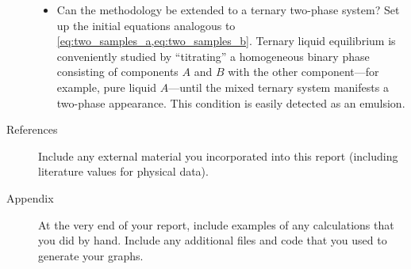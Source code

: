 \begin{description}
\begin{itemize}
		\item Can the methodology be extended to a ternary two-phase system?
		Set up the initial equations analogous to \cref{eq:two_samples_a,eq:two_samples_b}. 
		Ternary liquid equilibrium is conveniently studied by ``titrating'' a homogeneous binary phase consisting of components \(A\) and \(B\) with the other component---for example, pure liquid \(A\)---until the mixed ternary system manifests a two-phase appearance. 
		This condition is easily detected as an emulsion.
	\end{itemize}
	\item[References] Include any external material you incorporated into this report (including literature values for physical data). 
	\item[Appendix] At the very end of your report, include examples of any calculations that you did by hand. 
	Include any additional files and code that you used to generate your graphs.
\end{description}
